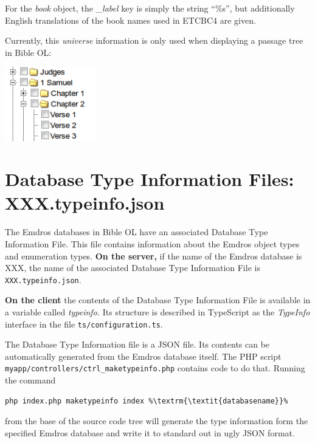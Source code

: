 \documentclass[11pt,oneside,a4paper]{memoir}
\begin{document}
For the \emph{book} object, the \emph{\_label} key is simply the string ``\%s'', but additionally
English translations of the book names used in ETCBC4 are given.

Currently, this \emph{universe} information is only used when displaying a passage tree in Bible OL:

\begin{center}
  \includegraphics[width=0.3\textwidth]{universe.png}
\end{center}


\section{Database Type Information Files: XXX.typeinfo.json}\label{tif}

The Emdros databases in Bible OL have an associated Database Type Information File. This file
contains information about the Emdros object types and enumeration types. \textbf{On the server,} if
the name of the Emdros database is XXX, the name of the associated Database Type Information File is
\texttt{XXX.typeinfo.json}.

\textbf{On the client} the contents of the Database Type Information File is available in a variable
called \emph{typeinfo.} Its structure is described in TypeScript as the \emph{TypeInfo} interface in the file
\texttt{ts/configuration.ts}.

The Database Type Information file is a JSON file. Its contents can be automatically generated from
the Emdros database itself. The PHP script \texttt{myapp/controllers/ctrl\_maketypeinfo.php}
contains code to do that. Running the command

\begin{lstlisting}
php index.php maketypeinfo index %\textrm{\textit{databasename}}%
\end{lstlisting}

\noindent
from the base of the source code tree will generate the type information form the specified Emdros
database and write it to standard out in ugly JSON format.
\end{document}
